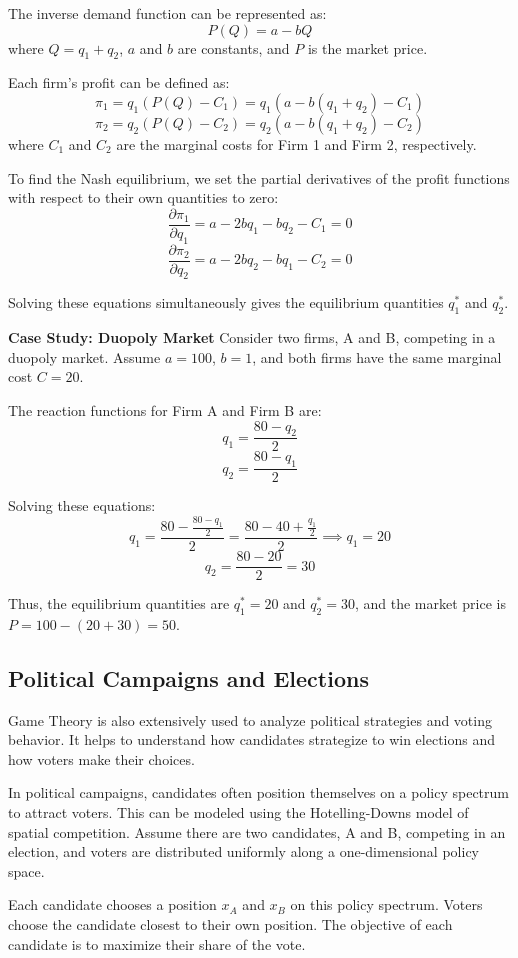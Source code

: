 \documentclass[12pt]{book} %
\begin{document}
The inverse demand function can be represented as:
\[
P(Q) = a - bQ
\]
where \( Q = q_1 + q_2 \), \( a \) and \( b \) are constants, and \( P \) is the market price.

Each firm's profit can be defined as:
\[
\pi_1 = q_1 (P(Q) - C_1) = q_1 (a - b(q_1 + q_2) - C_1)
\]
\[
\pi_2 = q_2 (P(Q) - C_2) = q_2 (a - b(q_1 + q_2) - C_2)
\]
where \( C_1 \) and \( C_2 \) are the marginal costs for Firm 1 and Firm 2, respectively.

To find the Nash equilibrium, we set the partial derivatives of the profit functions with respect to their own quantities to zero:
\[
\frac{\partial \pi_1}{\partial q_1} = a - 2bq_1 - bq_2 - C_1 = 0
\]
\[
\frac{\partial \pi_2}{\partial q_2} = a - 2bq_2 - bq_1 - C_2 = 0
\]

Solving these equations simultaneously gives the equilibrium quantities \( q_1^* \) and \( q_2^* \).

\textbf{Case Study: Duopoly Market}
Consider two firms, A and B, competing in a duopoly market. Assume \( a = 100 \), \( b = 1 \), and both firms have the same marginal cost \( C = 20 \).

The reaction functions for Firm A and Firm B are:
\[
q_1 = \frac{80 - q_2}{2}
\]
\[
q_2 = \frac{80 - q_1}{2}
\]

Solving these equations:
\[
q_1 = \frac{80 - \frac{80 - q_1}{2}}{2} = \frac{80 - 40 + \frac{q_1}{2}}{2} \implies q_1 = 20
\]
\[
q_2 = \frac{80 - 20}{2} = 30
\]

Thus, the equilibrium quantities are \( q_1^* = 20 \) and \( q_2^* = 30 \), and the market price is \( P = 100 - (20 + 30) = 50 \).

\subsection{Political Campaigns and Elections}
Game Theory is also extensively used to analyze political strategies and voting behavior. It helps to understand how candidates strategize to win elections and how voters make their choices.

In political campaigns, candidates often position themselves on a policy spectrum to attract voters. This can be modeled using the Hotelling-Downs model of spatial competition. Assume there are two candidates, A and B, competing in an election, and voters are distributed uniformly along a one-dimensional policy space.

Each candidate chooses a position \( x_A \) and \( x_B \) on this policy spectrum. Voters choose the candidate closest to their own position. The objective of each candidate is to maximize their share of the vote.
\end{document}

